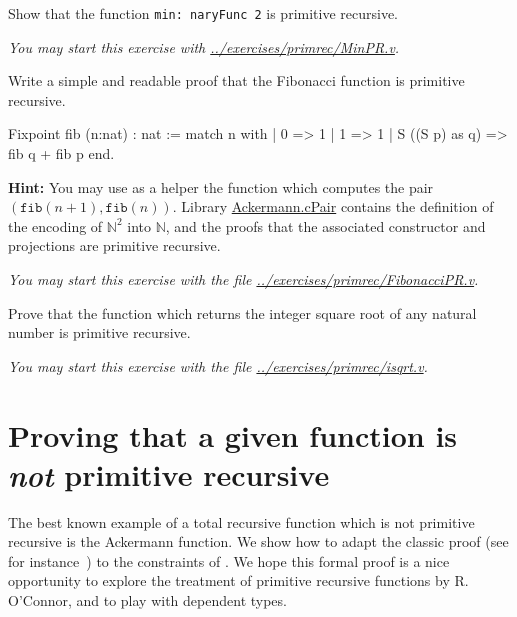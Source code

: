 \begin{exercise}
Show that the function \texttt{min: naryFunc\,2} is primitive
recursive.

\emph{You may start this exercise with
\url{../exercises/primrec/MinPR.v}.}

\end{exercise}


\begin{exercise}
Write a simple and readable proof that the Fibonacci function is primitive recursive.


\begin{Coqsrc}
Fixpoint fib (n:nat) : nat :=
  match n with
  | 0 => 1
  | 1 => 1
  | S ((S p) as q) => fib q + fib p
  end.
\end{Coqsrc}

\textbf{Hint:}  You may use as a helper the function which computes the pair 
$(\texttt{fib}(n+1),\texttt{fib}(n))$. 
Library \href{../theories/html/hydras.Ackermann.cPair.html}{Ackermann.cPair} contains
the definition of the encoding of $\mathbb{N}^2$ into $\mathbb{N}$, and the proofs that 
the associated constructor and projections are primitive recursive.


\emph{You may start this exercise with the file
\url{../exercises/primrec/FibonacciPR.v}.}

\end{exercise}


\begin{exercise}
Prove that the function which returns the  integer square root of any natural number  is primitive recursive.

\emph{You may start this exercise with the file
\url{../exercises/primrec/isqrt.v}.}

\end{exercise}

\section{Proving that a given function is \emph{not} primitive recursive}

The best known example of a total recursive function which is not primitive recursive is the Ackermann function. We show how to adapt the classic proof (see for instance~\cite{planetmath}) to the constraints of \gallina. We hope this formal proof 
 is a nice opportunity to explore
the treatment of primitive recursive functions by R. O'Connor,
and to play with dependent types.

